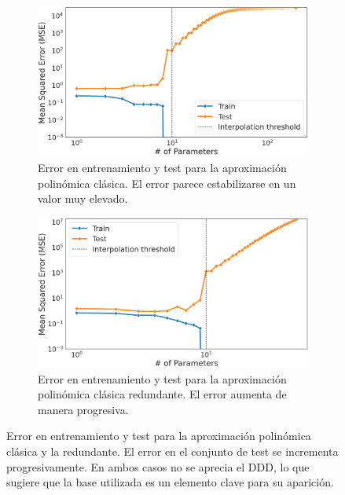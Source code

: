 \begin{figure}[h]
    \centering
    \begin{subfigure}[b]{0.48\textwidth}
        \centering
        \includegraphics[width=\textwidth]{img/experiments/OLS1DDD.png}
        \caption{Error en entrenamiento y test para la aproximación polinómica clásica. El error parece estabilizarse en un valor muy elevado.}\label{fig:OLS1DDD}
    \end{subfigure}
    \hfill
    \begin{subfigure}[b]{0.48\textwidth}
        \centering
        \includegraphics[width=\textwidth]{img/experiments/Redundant1DDD.png}
        \caption{Error en entrenamiento y test para la aproximación polinómica clásica redundante. El error aumenta de manera progresiva.}\label{fig:Redundant1DDD}
    \end{subfigure}
    \caption[Error en entrenamiento y test para las distintas aproximaciones polinómicas.]{Error en entrenamiento y test para la aproximación polinómica clásica y la redundante. El error en el conjunto de test se incrementa progresivamente. En ambos casos no se aprecia el DDD, lo que sugiere que la base utilizada es un elemento clave para su aparición.}\label{fig:aproximaciones-polinomicas}
\end{figure}

